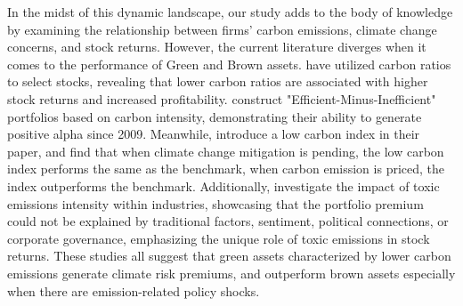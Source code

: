 \documentclass[12pt]{article}
\begin{document}
In the midst of this dynamic landscape, our study adds to the body of knowledge by examining the relationship between firms' carbon emissions, climate change concerns, and stock returns. However, the current literature diverges when it comes to the performance of Green and Brown assets.  \cite{garvey2018carbon} have utilized carbon ratios to select stocks, revealing that lower carbon ratios are associated with higher stock returns and increased profitability. \cite{in2017being} construct "Efficient-Minus-Inefficient" portfolios based on carbon intensity, demonstrating their ability to generate positive alpha since 2009. Meanwhile, \cite{andersson2016hedging} introduce a low carbon index in their paper, and find that when climate change mitigation is pending, the low carbon index performs the same as the benchmark, when carbon emission is priced, the index outperforms the benchmark. Additionally, \cite{hsu2023pollution} investigate the impact of toxic emissions intensity within industries, showcasing that the portfolio premium could not be explained by traditional factors, sentiment, political connections, or corporate governance, emphasizing the unique role of toxic emissions in stock returns. These studies all suggest that green assets characterized by lower carbon emissions generate climate risk premiums, and outperform brown assets especially when there are emission-related policy shocks.
\end{document}
